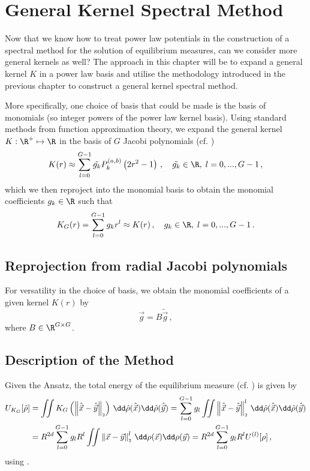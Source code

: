 \chapter{General Kernel Spectral Method}
\label{chap:general-kernel-spectral-method}

Now that we know how to treat power law potentials in the construction of a spectral method for the solution of equilibrium measures, can we consider more general kernels as well?
The approach in this chapter will be to expand a general kernel $K$ in a power law basis and utilise the methodology introduced in the previous chapter to construct a general kernel spectral method.

More specifically, one choice of basis that could be made is the basis of monomials (so integer powers of the power law kernel basis).
Using standard methods from function approximation theory, we expand the general kernel $K: \R^+ \mapsto \R$ in the basis of $G$ Jacobi polynomials (cf. )
$$K(r) \approx \sum_{l=0}^{G-1} \tilde{g_k} P_k^{(a, b)}\left(2 r^2 - 1\right)\,, \quad \tilde{g_k} \in \R, \;l = 0, ..., G-1\,,$$
which we then reproject into the monomial basis to obtain the monomial coefficients $g_k \in \R$ such that
\begin{equation}
  K_G(r) = \sum_{l=0}^{G-1} g_k r^l \approx K(r)\,,\quad g_k \in \R, \;l=0, ..., G-1\,.
  \label{eq:monomial-expansion}
\end{equation}

\section{Reprojection from radial Jacobi polynomials}
For versatility in the choice of basis, we obtain the monomial coefficients of a given kernel $K(r)$ by
$$\vec{g} = B \tilde{\vec{g}}\,,$$
where $B \in \R^{G \times G}$.


\section{Description of the Method}
Given the Ansatz, the total energy of the equilibrium measure (cf. ) is given by
\begin{align*}
  U_{K_G}[\hat{\rho}] & = \iint K_G\left(\norm{\hatvec{x}-\hatvec{y}}\right) \,\dd\hat{\rho}(\hatvec{x})\dd\hat{\rho}(\hatvec{y})
  = \sum_{l=0}^{G-1} g_l \iint \norm{\hatvec{x}-\hatvec{y}}^l \,\dd\hat{\rho}(\hatvec{x})\dd\hat{\rho}(\hatvec{y})                \\
                      & = R^{2d} \sum_{l=0}^{G-1} g_l R^l \iint \norm{\vec{x}-\vec{y}}^l \,\dd\rho(\vec{x})\dd\rho(\vec{y})
  = R^{2d} \sum_{l=0}^{G-1} g_l R^l U^{(l)}[\rho]\,,
\end{align*}
using .

